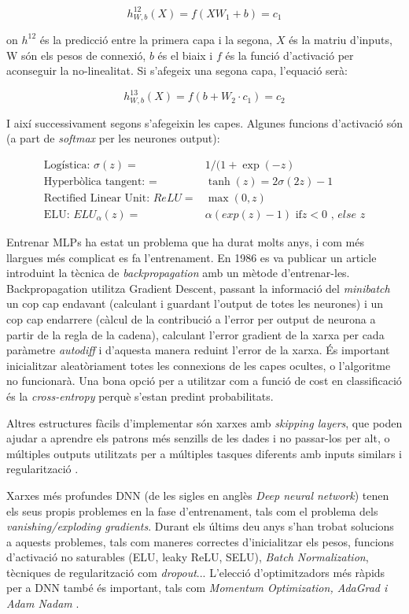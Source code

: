 \documentclass[12pt, spanish]{article}
\begin{document}
$$
h^{12}_{W,b}(X) = f(XW_1 + b) = c_1
$$

on $h^{12}$ és la predicció entre la primera capa i la segona, $X$ és la matriu d'inputs, W són els pesos de connexió, $b$ és el biaix i $f$ és la funció d'activació per aconseguir la no-linealitat. Si s'afegeix una segona capa, l'equació serà:

$$
h^{13}_{W,b}(X) = f(b + W_2 \cdot c_1) = c_2
$$

I així successivament segons s'afegeixin les capes. Algunes funcions d'activació són (a part de \textit{softmax} per les neurones output):
 
\begin{align*}
\text{Logística: }  \sigma(z) = & 1 / (1 + \exp(-z) \\
\text{Hyperbòlica tangent: } = & \tanh(z) = 2\sigma(2z) - 1\\
\text{Rectified Linear Unit: } ReLU = & \max(0, z) \\
\text{ELU: }  ELU_\alpha(z) = & \alpha(exp(z) - 1) \text{ if} z < 0\textit{ , else }z
\end{align*}

Entrenar MLPs ha estat un problema que ha durat molts anys, i com més llargues més complicat es fa l'entrenament. En 1986 es va publicar un article \cite{rumelhart1985learning} introduint la tècnica de \textit{backpropagation} amb un mètode d'entrenar-les. Backpropagation utilitza Gradient Descent, passant la informació del \textit{minibatch} un cop cap endavant (calculant i guardant l'output de totes les neurones) i un cop cap endarrere (càlcul de la contribució a l'error per output de neurona a partir de la regla de la cadena),  calculant l'error gradient de la xarxa per cada paràmetre \textit{autodiff} i d'aquesta manera reduint l'error de la xarxa. És important inicialitzar aleatòriament totes les connexions de les capes ocultes, o l'algoritme no funcionarà.  Una bona opció per a utilitzar com a funció de cost en classificació és la \textit{cross-entropy} perquè s'estan predint probabilitats.

Altres estructures fàcils d'implementar són xarxes amb \textit{skipping layers}, que poden ajudar a aprendre els patrons més senzills de les dades i no passar-los per alt, o múltiples outputs utilitzats per a múltiples tasques diferents amb inputs similars i regularització \cite[Cap. 10]{geron2019hands}.

Xarxes més profundes DNN (de les sigles en anglès \textit{Deep neural network}) tenen els seus propis problemes en la fase d'entrenament, tals com el problema dels \textit{vanishing/exploding gradients}. Durant els últims deu anys s'han trobat solucions a aquests problemes, tals com maneres correctes d'inicialitzar els pesos, funcions d'activació no saturables (ELU, leaky ReLU, SELU), \textit{Batch Normalization}, tècniques de regularització com \textit{dropout}... L'elecció d'optimitzadors més ràpids per a DNN també és important, tals com \textit{Momentum Optimization, AdaGrad i Adam Nadam} \cite[Cap. 11]{geron2019hands}.
\end{document}

